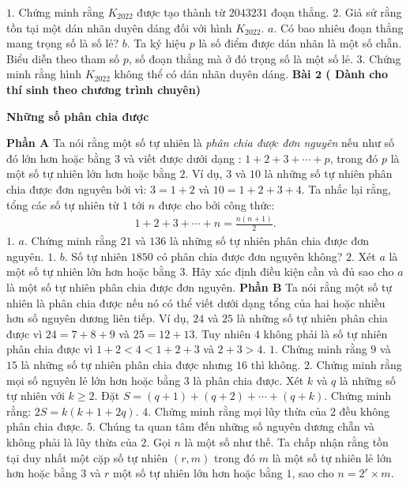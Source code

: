 \begin{multicols}{2}
	\vskip 0.1cm
	$1.$ Chứng minh rằng $K_{2022}$ được tạo thành từ $2 043 231$ đoạn thẳng.
	\vskip 0.1cm
	$2.$ Giả sử rằng tồn tại một dán nhãn duyên dáng đối với hình $K_{2022}$.
	\vskip 0.1cm
	$a.$ Có bao nhiêu đoạn thẳng mang trọng số là số lẻ?
	\vskip 0.1cm
	$b.$ Ta ký hiệu $p$ là số điểm được dán nhãn là một số chẵn. Biểu diễn theo tham số $p$, số đoạn thẳng mà ở đó trọng số là một số lẻ.
	\vskip 0.1cm 
	$3.$ Chứng minh rằng hình $K_{2022}$ không thể có dán nhãn duyên dáng.
	\vskip 0.1cm
	\textbf{\color{cackithi}Bài $\pmb{2}$ ( Dành cho thí sinh theo chương trình chuyên)}
	\begin{center}
		\textbf{\color{cackithi}Những số phân chia được}
	\end{center}
	\textbf{\color{cackithi}Phần A}
	\vskip 0.1cm
	Ta nói rằng một số tự nhiên là \textit{phân chia được đơn nguyên} nếu như số đó lớn hơn hoặc bằng $3$ và viết được dưới dạng : $1+2+3+\cdots +p$, trong đó $p$ là một số tự nhiên lớn hơn hoặc bằng $2$. Ví dụ, $3$ và $10$ là những số tự nhiên phân chia được đơn nguyên bởi vì: $3 =1+2$  và $10=1+2+3+4$.
	\vskip 0.1cm 
	Ta nhắc lại rằng, tổng các số tự nhiên từ $1$ tới $n$ được cho bởi công thức: 
	\begin{align*}
		1+2+3+\cdots+n=\frac{n(n+1)}{2}.
	\end{align*}
	$1.$ $a.$ Chứng minh rằng $21$ và $136$ là những số tự nhiên phân chia được đơn nguyên.  
	\vskip 0.1cm
	$1.$ $b.$ Số tự nhiên $1850$ có phân chia được đơn nguyên không?
	\vskip 0.1cm
	$2.$ Xét $a$ là một số tự nhiên lớn hơn hoặc bằng $3$. Hãy xác định điều kiện cần và đủ sao cho $a$ là một số tự nhiên phân chia được đơn nguyên. 
	\vskip 0.1cm
	\textbf{\color{cackithi}Phần B}
	\vskip 0.1cm
	Ta nói rằng một số tự nhiên là phân chia được nếu nó có thể viết dưới dạng tổng của hai hoặc nhiều hơn số nguyên dương liên tiếp. Ví dụ, $24$ và $25$ là những số tự nhiên phân chia được vì $24 = 7 + 8 + 9$ và $25 = 12 + 13$. Tuy nhiên $4$ không phải là số tự nhiên phân chia được vì $1 + 2 < 4 < 1 + 2 + 3$ và $2 + 3 > 4$.
	\vskip 0.1cm
	$1.$ Chứng minh rằng $9$ và $15$ là những số tự nhiên phân chia được nhưng $16$ thì không.
	\vskip 0.1cm
	$2.$ Chứng minh rằng mọi số nguyên lẻ lớn hơn hoặc bằng $3$ là phân chia được. 
	\vskip 0.1cm
	Xét $k$ và $q$ là những số tự nhiên với $k\ge 2$.  Đặt $S=(q+1)+(q+2)+\cdots+(q+k)$. Chứng minh rằng: $2S=k(k+1+2q)$.
	\vskip 0.1cm
	$4.$ Chứng minh rằng mọi lũy thừa của $2$ đều không phân chia được. 
	 \vskip 0.1cm
	$5.$ Chúng ta quan tâm đến những số nguyên dương chẵn và không phải là lũy thừa của $2$. Gọi $n$ là một số như thế. Ta chấp nhận rằng tồn tại duy nhất một cặp số tự nhiên $(r,m)$ trong đó $m$ là một số tự nhiên lẻ lớn hơn hoặc bằng $3$ và $r$ một số tự nhiên lớn hơn hoặc bằng $1$, sao cho  $n=2^r\times m$.

\end{multicols}
